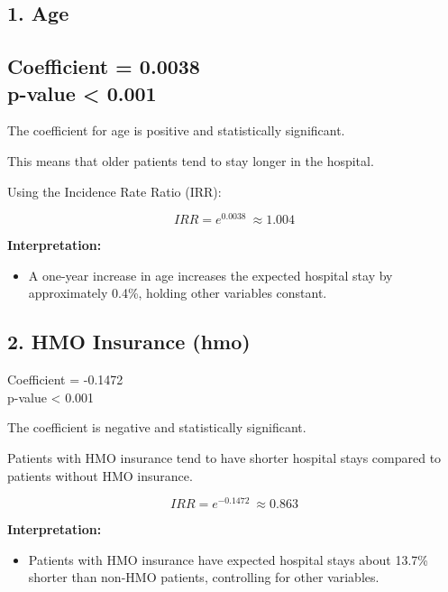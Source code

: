 \documentclass[
]{article}
\begin{document}
\subsection{\texorpdfstring{\textbf{1. Age}}{1. Age}}\label{age}

\subsection{\texorpdfstring{Coefficient = 0.0038\\
p-value \textless{}
0.001}{Coefficient = 0.0038 p-value \textless{} 0.001}}\label{coefficient-0.0038-p-value-0.001}

The coefficient for age is positive and statistically significant.

This means that older patients tend to stay longer in the hospital.

Using the Incidence Rate Ratio (IRR):

\[IRR = e^{0.0038}\  \approx 1.004\]

\textbf{Interpretation:}

\begin{itemize}
\item
  A one-year increase in age increases the expected hospital stay by
  approximately 0.4\%, holding other variables constant.
\end{itemize}

\subsection{\texorpdfstring{\textbf{2. HMO Insurance
(hmo)}}{2. HMO Insurance (hmo)}}\label{hmo-insurance-hmo}

Coefficient = -0.1472\\
p-value \textless{} 0.001

The coefficient is negative and statistically significant.

Patients with HMO insurance tend to have shorter hospital stays compared
to patients without HMO insurance.

\[IRR = e^{- 0.1472}\  \approx 0.863\]

\textbf{Interpretation:}

\begin{itemize}
\item
  Patients with HMO insurance have expected hospital stays about 13.7\%
  shorter than non-HMO patients, controlling for other variables.
\end{itemize}
\end{document}
